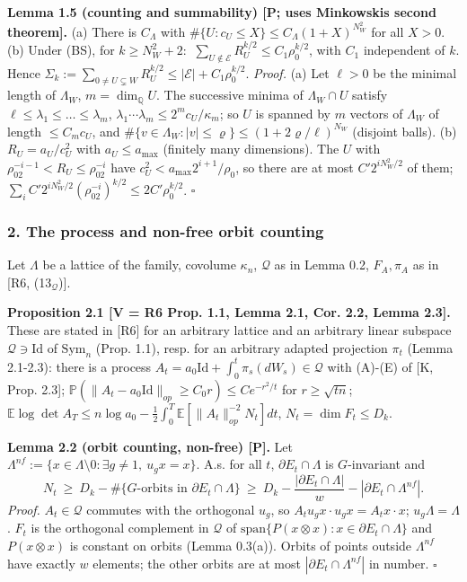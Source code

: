 \textbf{Lemma 1.5 (counting and summability) {[}P; uses Minkowski\textquotesingle s second theorem{]}.} (a) There is \(C_\Lambda\) with \(\#\{U:c_U\le X\}\le C_\Lambda(1+X)^{N_W^2}\) for all \(X>0\). (b) Under (BS), for \(k\ge N_W^2+2\): \(\ \sum_{U\notin\mathcal E}R_U^{k/2}\le C_1\rho_0^{k/2}\), with \(C_1\) independent of \(k\). Hence \(\Sigma_k:=\sum_{0\ne U\subsetneq W}R_U^{k/2}\le|\mathcal E|+C_1\rho_0^{k/2}\).
\emph{Proof.} (a) Let \(\ell>0\) be the minimal length of \(\Lambda_W\), \(m=\dim_{\mathbb Q}U\). The successive minima of \(\Lambda_W\cap U\) satisfy \(\ell\le\lambda_1\le\dots\le\lambda_m\), \(\lambda_1\cdots\lambda_m\le2^mc_U/\kappa_m\); so \(U\) is spanned by \(m\) vectors of \(\Lambda_W\) of length \(\le C_mc_U\), and \(\#\{v\in\Lambda_W:|v|\le\varrho\}\le(1+2\varrho/\ell)^{N_W}\) (disjoint balls). (b) \(R_U=a_U/c_U^2\) with \(a_U\le a_{\max}\) (finitely many dimensions). The \(U\) with \(\rho_02^{-i-1}<R_U\le\rho_02^{-i}\) have \(c_U^2<a_{\max}2^{i+1}/\rho_0\), so there are at most \(C'2^{iN_W^2/2}\) of them; \(\sum_iC'2^{iN_W^2/2}(\rho_02^{-i})^{k/2}\le2C'\rho_0^{k/2}\). \(\square\)

\hypertarget{the-process-and-non-free-orbit-counting}{%
\subsubsection*{2. The process and non-free orbit counting}\label{the-process-and-non-free-orbit-counting}}

Let \(\Lambda\) be a lattice of the family, covolume \(\kappa_n\), \(\mathcal Q\) as in Lemma 0.2, \(F_A,\pi_A\) as in {[}R6, (13\(_\mathcal Q\)){]}.

\textbf{Proposition 2.1 {[}V = R6 Prop. 1.1, Lemma 2.1, Cor. 2.2, Lemma 2.3{]}.} These are stated in {[}R6{]} for an arbitrary lattice and an arbitrary linear subspace \(\mathcal Q\ni\mathrm{Id}\) of \(\mathrm{Sym}_n\) (Prop. 1.1), resp. for an arbitrary adapted projection \(\pi_t\) (Lemma 2.1-2.3): there is a process \(A_t=a_0\mathrm{Id}+\int_0^t\pi_s(dW_s)\in\mathcal Q\) with (A)-(E) of {[}K, Prop. 2.3{]}; \(\mathbb P(\|A_t-a_0\mathrm{Id}\|_{op}\ge C_0r)\le Ce^{-r^2/t}\) for \(r\ge\sqrt{tn}\); \(\mathbb E\log\det A_T\le n\log a_0-\frac12\int_0^T\mathbb E[\|A_t\|_{op}^{-2}N_t]dt\), \(N_t=\dim F_t\le D_k\).

\textbf{Lemma 2.2 (orbit counting, non-free) {[}P{]}.} Let \(\Lambda^{nf}:=\{x\in\Lambda\setminus0:\exists g\ne1,\ u_gx=x\}\). A.s. for all \(t\), \(\partial E_t\cap\Lambda\) is \(G\)-invariant and
\[N_t\ \ge\ D_k-\#\{G\text{-orbits in }\partial E_t\cap\Lambda\}\ \ge\ D_k-\frac{|\partial E_t\cap\Lambda|}{w}-|\partial E_t\cap\Lambda^{nf}| .\]
\emph{Proof.} \(A_t\in\mathcal Q\) commutes with the orthogonal \(u_g\), so \(A_tu_gx\cdot u_gx=A_tx\cdot x\); \(u_g\Lambda=\Lambda\). \(F_t\) is the orthogonal complement in \(\mathcal Q\) of \(\mathrm{span}\{P(x\otimes x):x\in\partial E_t\cap\Lambda\}\) and \(P(x\otimes x)\) is constant on orbits (Lemma 0.3(a)). Orbits of points outside \(\Lambda^{nf}\) have exactly \(w\) elements; the other orbits are at most \(|\partial E_t\cap\Lambda^{nf}|\) in number. \(\square\)

